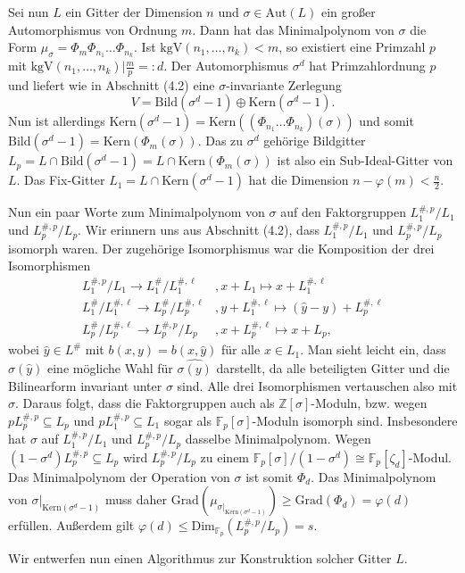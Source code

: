 \documentclass[12pt,a4paper,halfparskip,headsepline,bibtotocnumbered]{scrreprt}
\theoremstyle{nummermitklammern}
\theoremstyle{nonumberbreak}
\newcommand{\Z}{\mathbb{Z}}
\newcommand{\F}{\mathbb{F}}
\newcommand{\Kern}{\text{Kern}}
\newcommand{\Bild}{\text{Bild}}
\newcommand{\kgV}{\text{kgV}}
\newcommand{\Aut}{\text{Aut}}
\begin{document}
Sei nun $L$ ein Gitter der Dimension $n$ und $\sigma \in \Aut(L)$ ein großer Automorphismus von Ordnung $m$. Dann hat das Minimalpolynom von $\sigma$ die Form $\mu_\sigma = \Phi_m \Phi_{n_1} \dots \Phi_{n_k}$. Ist $\kgV(n_1, \dots, n_k) < m$, so existiert eine Primzahl $p$ mit $\kgV(n_1, \dots, n_k) \vert \frac{m}{p} =: d$. Der Automorphismus $\sigma^d$ hat Primzahlordnung $p$ und liefert wie in Abschnitt (4.2) eine $\sigma$-invariante Zerlegung 
\begin{equation*}
	V = \Bild(\sigma^d-1) \oplus \Kern(\sigma^d-1).
\end{equation*}
Nun ist allerdings $\Kern(\sigma^d-1) = \Kern\left((\Phi_{n_1} \dots \Phi_{n_k})(\sigma)\right)$ und somit $\Bild(\sigma^d-1) = \Kern(\Phi_m(\sigma))$. Das zu $\sigma^d$ gehörige Bildgitter $L_p = L \cap \Bild(\sigma^d-1) = L \cap \Kern(\Phi_m(\sigma))$ ist also ein Sub-Ideal-Gitter von $L$. Das Fix-Gitter $L_1 = L \cap \Kern(\sigma^d-1)$ hat die Dimension $n-\varphi(m) < \frac{n}{2}$.\par
Nun ein paar Worte zum Minimalpolynom von $\sigma$ auf den Faktorgruppen $L_1^{\#,p}/L_1$ und $L_p^{\#,p} / L_p$. Wir erinnern uns aus Abschnitt (4.2), dass $L_1^{\#,p}/L_1$ und $L_p^{\#,p} / L_p$ isomorph waren. Der zugehörige Isomorphismus war die Komposition der drei Isomorphismen
\begin{align*}
	L_1^{\#,p} / L_1 \rightarrow L_1^\# / L_1^{\#, \ell}&, x + L_1 \mapsto x + L_1^{\#, \ell}\\
	L_1^\#/L_1^{\#,\ell} \rightarrow L_p^\# / L_p^{\#,\ell}&, y + L_1^{\#, \ell} \mapsto (\hat{y} - y) + L_p^{\#, \ell}\\
	L_p^\# / L_p^{\#, \ell} \rightarrow L_p^{\#,p} / L_p&, x + L_p^{\#, \ell} \mapsto x + L_p,
\end{align*}
wobei $\hat{y} \in L^\#$ mit $b(x,y) = b(x,\hat{y})$ für alle $x \in L_1$. Man sieht leicht ein, dass $\sigma(\hat{y})$ eine mögliche Wahl für $\widehat{\sigma(y)}$ darstellt, da alle beteiligten Gitter und die Bilinearform invariant unter $\sigma$ sind. Alle drei Isomorphismen vertauschen also mit $\sigma$. Daraus folgt, dass die Faktorgruppen auch als $\Z[\sigma]$-Moduln, bzw. wegen $p L_p^{\#,p} \subseteq L_p$ und $p L_1^{\#,p} \subseteq L_1$ sogar als $\F_p[\sigma]$-Moduln isomorph sind. Insbesondere hat $\sigma$ auf $L_1^{\#,p}/L_1$ und $L_p^{\#,p}/L_p$ dasselbe Minimalpolynom. Wegen $(1-\sigma^d) L_p^{\#,p} \subseteq L_p$ wird $L_p^{\#,p}/L_p$ zu einem $\F_p[\sigma] / (1-\sigma^d) \cong \F_p[\zeta_d]$-Modul. Das Minimalpolynom der Operation von $\sigma$ ist somit $\Phi_d$. Das Minimalpolynom von $\sigma \vert_{\Kern(\sigma^d-1)}$ muss daher $\text{Grad}(\mu_{\sigma \vert_{\Kern(\sigma^d-1)}}) \geq \text{Grad}(\Phi_d) = \varphi(d)$ erfüllen. Außerdem gilt $\varphi(d) \leq \text{Dim}_{\F_p}(L_p^{\#,p} / L_p) = s$.\par
Wir entwerfen nun einen Algorithmus zur Konstruktion solcher Gitter $L$.
\end{document}
